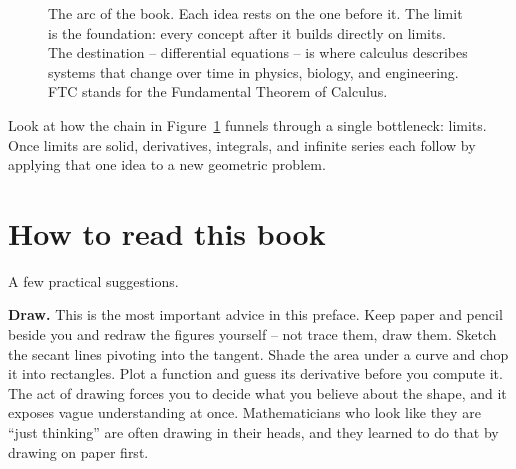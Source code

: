 \begin{figure}[htbp]
\centering
{}
\caption{The arc of the book. Each idea rests on the one before it. The limit is the foundation: every
concept after it builds directly on limits. The destination -- differential equations --
is where calculus describes systems that change over time in physics, biology, and engineering.
FTC stands for the Fundamental Theorem of Calculus.}
\label{ch00:arc}
\end{figure}

\begin{aestheticbox}
Look at how the chain in Figure~\ref{ch00:arc} funnels through a single bottleneck: limits. Once limits are solid, derivatives, integrals, and infinite series each follow by applying that one idea to a new geometric problem.
\end{aestheticbox}

\section*{How to read this book}

A few practical suggestions.

\textbf{Draw.} This is the most important advice in this preface. Keep paper and pencil beside you
and redraw the figures yourself -- not trace
them, draw them. Sketch the secant lines pivoting into the tangent. Shade the area under a curve and
chop it into rectangles. Plot a function and guess its derivative before you compute it. The act of
drawing forces you to decide what you believe about the shape, and it exposes vague
understanding at once. Mathematicians who look like they are ``just thinking'' are often
drawing in their heads, and they learned to do that by drawing on paper first.

